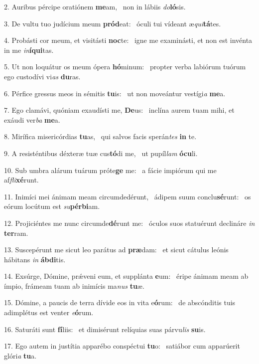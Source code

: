 2. Auribus pércipe oratiónem \textbf{me}am, \ast\  non in lábiis \textit{do}\textbf{ló}sis.\

3. De vultu tuo judícium meum \textbf{pród}eat: \ast\  óculi tui vídeant æ\textit{qui}\textbf{tá}tes.\

4. Probásti cor meum, et visitásti \textbf{noc}te: \ast\  igne me examinásti, et non est invénta in me \textit{in}\textbf{í}\textbf{qui}tas.\

5. Ut non loquátur os meum ópera \textbf{hó}minum: \ast\  propter verba labiórum tuórum ego custodívi vi\textit{as} \textbf{du}ras.\

6. Pérfice gressus meos in sémitis \textbf{tu}is: \ast\  ut non moveántur vestígi\textit{a} \textbf{me}a.\

7. Ego clamávi, quóniam exaudísti me, \textbf{De}us: \ast\  inclína aurem tuam mihi, et exáudi ver\textit{ba} \textbf{me}a.\

8. Mirífica misericórdias \textbf{tu}as, \ast\  qui salvos facis sperán\textit{tes} \textbf{in} te.\

9. A resisténtibus déxteræ tuæ cus\textbf{tó}di me, \ast\  ut pupíl\textit{lam} \textbf{ó}\textbf{cu}li.\

10. Sub umbra alárum tuárum próte\textbf{ge} me: \ast\  a fácie impiórum qui me af\textit{fli}\textbf{xé}runt.\

11. Inimíci mei ánimam meam circumdedérunt, \dag\  ádipem suum conclu\textbf{sé}runt: \ast\  os eórum locútum est \textit{su}\textbf{pér}\textbf{bi}am.\

12. Projiciéntes me nunc circumde\textbf{dé}runt me: \ast\  óculos suos statuérunt declináre \textit{in} \textbf{ter}ram.\

13. Suscepérunt me sicut leo parátus ad \textbf{præ}dam: \ast\  et sicut cátulus leónis hábitans \textit{in} \textbf{áb}\textbf{di}tis.\

14. Exsúrge, Dómine, prǽveni eum, et supplánta \textbf{e}um: \ast\  éripe ánimam meam ab ímpio, frámeam tuam ab inimícis ma\textit{nus} \textbf{tu}æ.\

15. Dómine, a paucis de terra dívide eos in vita e\textbf{ó}rum: \ast\  de abscónditis tuis adimplétus est venter \textit{e}\textbf{ó}rum.\

16. Saturáti sunt \textbf{fí}liis: \ast\  et dimisérunt relíquias suas párvu\textit{lis} \textbf{su}is.\

17. Ego autem in justítia apparébo conspéctui \textbf{tu}o: \ast\  satiábor cum apparúerit glóri\textit{a} \textbf{tu}a.\

